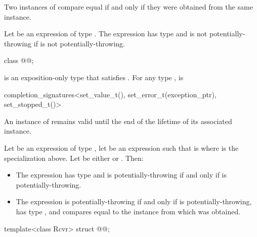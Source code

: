 \pnum
Two instances of  compare equal
if and only if they were obtained from the same  instance.

\pnum
Let  be an expression of type .
The expression 
has type  and
is not potentially-throwing if  is not potentially-throwing.

\begin{itemdecl}
class @@;
\end{itemdecl}

\pnum
{} is an exposition-only type
that satisfies .
For any type ,
 is
\begin{codeblock}
completion_signatures<set_value_t(), set_error_t(exception_ptr), set_stopped_t()>
\end{codeblock}

\pnum
An instance of  remains valid
until the end of the lifetime of its associated  instance.

\pnum
Let  be an expression of type ,
let  be an expression
such that  is 
where  is the  specialization above.
Let  be either  or .
Then:
\begin{itemize}
\item
The expression 
has type 
and is potentially-throwing if and only if
 is potentially-throwing.
\item
The expression 
is potentially-throwing if and only if  is potentially-throwing,
has type , and
compares equal to the  instance
from which  was obtained.
\end{itemize}

\begin{itemdecl}
template<class Rcvr>
  struct @@;
\end{itemdecl}

